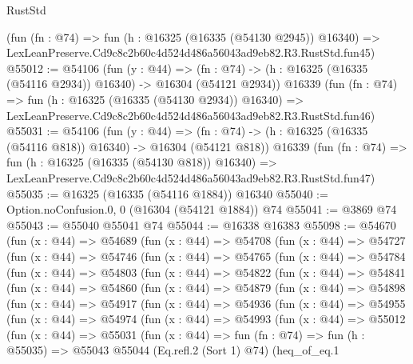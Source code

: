 \begin{lexlean}{RustStd}
\begin{coremodule}
    (fun (fn : @74) =>
    fun (h : @16325 (@16335 (@54130 @2945)) @16340) =>
    LexLeanPreserve.Cd9c8c2b60c4d524d486a56043ad9eb82.R3.RustStd.fun45)
@55012 := @54106
    (fun (y : @44) =>
    (fn : @74) -> (h : @16325 (@16335 (@54116 @2934)) @16340) -> @16304 (@54121 @2934))
    @16339
    (fun (fn : @74) =>
    fun (h : @16325 (@16335 (@54130 @2934)) @16340) =>
    LexLeanPreserve.Cd9c8c2b60c4d524d486a56043ad9eb82.R3.RustStd.fun46)
@55031 := @54106
    (fun (y : @44) =>
    (fn : @74) -> (h : @16325 (@16335 (@54116 @818)) @16340) -> @16304 (@54121 @818))
    @16339
    (fun (fn : @74) =>
    fun (h : @16325 (@16335 (@54130 @818)) @16340) =>
    LexLeanPreserve.Cd9c8c2b60c4d524d486a56043ad9eb82.R3.RustStd.fun47)
@55035 := @16325 (@16335 (@54116 @1884)) @16340
@55040 := Option.noConfusion.{0, 0} (@16304 (@54121 @1884)) @74
@55041 := @3869 @74
@55043 := @55040 @55041 @74
@55044 := @16338 @16383
@55098 := @54670
    (fun (x : @44) =>
    @54689
      (fun (x : @44) =>
      @54708
        (fun (x : @44) =>
        @54727
          (fun (x : @44) =>
          @54746
            (fun (x : @44) =>
            @54765
              (fun (x : @44) =>
              @54784
                (fun (x : @44) =>
                @54803
                  (fun (x : @44) =>
                  @54822
                    (fun (x : @44) =>
                    @54841
                      (fun (x : @44) =>
                      @54860
                        (fun (x : @44) =>
                        @54879
                          (fun (x : @44) =>
                          @54898
                            (fun (x : @44) =>
                            @54917
                              (fun (x : @44) =>
                              @54936
                                (fun (x : @44) =>
                                @54955
                                  (fun (x : @44) =>
                                  @54974
                                    (fun (x : @44) =>
                                    @54993
                                      (fun (x : @44) =>
                                      @55012
                                        (fun (x : @44) =>
                                        @55031
                                          (fun (x : @44) =>
                                          fun (fn : @74) =>
                                          fun (h : @55035) =>
                                          @55043
                                            @55044
                                            (Eq.refl.{2} (Sort 1) @74)
                                            (heq_of_eq.{1}

\end{coremodule}
\end{lexlean}

